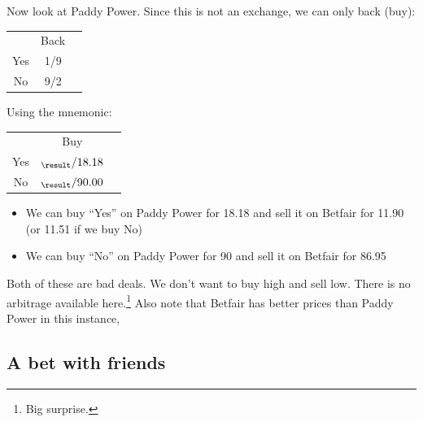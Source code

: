 \documentclass[a4paper]{article}
\newcommand{\odds}[1]{%
\FPeval{\result}{round(100-#1,2)}%
${}_{\result}/#1$%
}
\begin{document}
Now look at Paddy Power. Since this is not an exchange, we can only back (buy):
\begin{center}
\begin{tabular}{ccc}
\hline
       &  Back    \\
Yes    &   1/9   \\
No     &   9/2   \\
\hline
\end{tabular}
\end{center}
Using the mnemonic:
\begin{center}
\begin{tabular}{ccc}
\hline
       &  Buy           \\
Yes     &   \odds{18.18}   \\
No      &   \odds{90.00}   \\
\hline
\end{tabular}
\end{center}
\begin{itemize}
 \item We can buy ``Yes'' on Paddy Power for 18.18 and sell it on Betfair for 11.90 (or 11.51 if we buy No)
 \item We can buy ``No'' on Paddy Power for 90 and sell it on Betfair for 86.95
\end{itemize}
Both of these are bad deals. We don't want to buy high and sell low.
There is no arbitrage available here.\footnote{Big surprise.}
Also note that Betfair has better prices than Paddy Power in this instance,

\subsection{A bet with friends}
\end{document}
